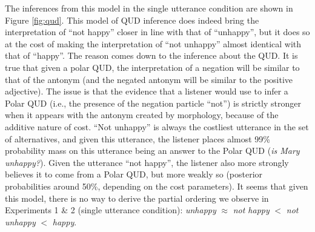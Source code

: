 \documentclass[floatsintext,doc]{apa6}
\begin{document}
The inferences from this model in the single utterance condition are shown in Figure \ref{fig:qud}. 
This model of QUD inference does indeed bring the interpretation of ``not happy'' closer in line with that of ``unhappy'', but it does so at the cost of making the interpretation of ``not unhappy'' almost identical with that of ``happy''. 
The reason comes down to the inference about the QUD. It is true that given a polar QUD, the interpretation of a negation will be similar to that of the antonym (and the negated antonym will be similar to the positive adjective). 
The issue is that the evidence that a listener would use to infer a Polar QUD (i.e., the presence of the negation particle ``not'') is strictly stronger when it appears with the antonym created by morphology, because of the additive nature of cost. ``Not unhappy'' is always the costliest utterance in the set of alternatives, and given this utterance, the listener places almost 99\% probability mass on this utterance being an answer to the Polar QUD (\emph{is Mary unhappy?}). 
Given the utterance ``not happy'', the listener also more strongly believes it to come from a Polar QUD, but more weakly so (posterior probabilities around 50\%, depending on the cost parameters). It seems that given this model, there is no way to derive the partial ordering we observe in Experiments 1 \& 2 (single utterance condition): \emph{unhappy} $\approx$ \emph{not happy} $<$ \emph{not unhappy} $<$ \emph{happy}. 

%
\end{document}
